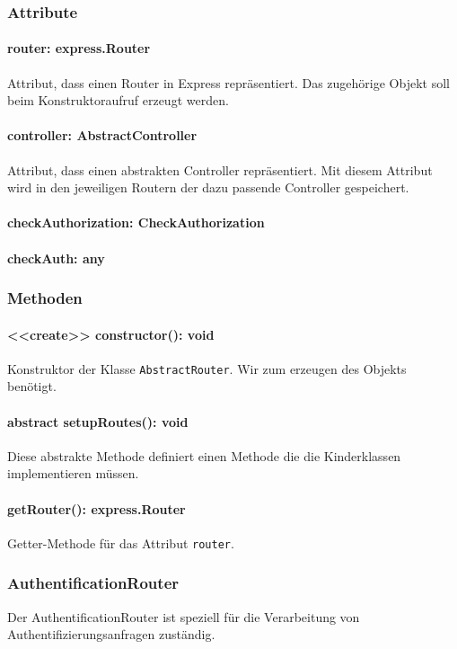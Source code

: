\documentclass[parskip=full]{scrartcl}
\begin{document}
\subsubsection*{Attribute}
\paragraph{router: express.Router}Attribut, dass einen Router in Express repräsentiert. Das zugehörige Objekt soll beim Konstruktoraufruf erzeugt werden. 
\paragraph{controller: AbstractController}Attribut, dass einen abstrakten Controller repräsentiert. Mit diesem Attribut wird in den jeweiligen Routern der dazu passende Controller gespeichert.
\paragraph{checkAuthorization: CheckAuthorization}
\paragraph{checkAuth: any}

\subsubsection*{Methoden}
\paragraph{<<create>> constructor(): void}Konstruktor der Klasse \texttt{AbstractRouter}. Wir zum erzeugen des Objekts benötigt.
\paragraph{abstract setupRoutes(): void}Diese abstrakte Methode definiert einen Methode die die Kinderklassen implementieren müssen.
\paragraph{getRouter(): express.Router}Getter-Methode für das Attribut \texttt{router}.


\subsubsection{AuthentificationRouter}
Der AuthentificationRouter ist speziell für die Verarbeitung von Authentifizierungsanfragen zuständig. 
\end{document}
